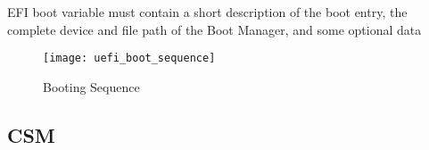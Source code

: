 EFI boot variable must contain a short description of the boot entry, the complete
device and file path of the Boot Manager, and some optional data
\cite{windows-internals-7-part2}

\begin{figure}[htb]%
    \centering%
    \texttt{[image: uefi\_boot\_sequence]}%
    \caption{Booting Sequence \cite[Figure 2-1]{uefi-spec}}%
    \label{fig:uefi-boot-sequence}%
\end{figure}

\subsection{\ac{CSM}}


